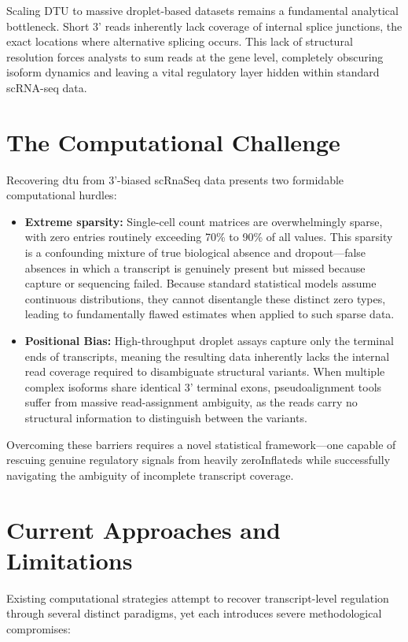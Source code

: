 Scaling DTU to massive droplet-based datasets remains a fundamental analytical bottleneck. Short 3' reads inherently lack coverage of internal splice junctions, the exact locations where alternative splicing occurs. This lack of structural resolution forces analysts to sum reads at the gene level, completely obscuring isoform dynamics and leaving a vital regulatory layer hidden within standard scRNA-seq data.

\section{The Computational Challenge}
Recovering \gls{dtu} from 3'-biased \gls{scRnaSeq} data presents two formidable computational hurdles:

\begin{itemize}
    \item \textbf{Extreme \gls{sparsity}:} Single-cell count matrices are overwhelmingly sparse, with zero entries routinely exceeding 70\% to 90\% of all values. This sparsity is a confounding mixture of true biological absence and \gls{dropout}---false absences in which a transcript is genuinely present but missed because capture or sequencing failed. Because standard statistical models assume continuous distributions, they cannot disentangle these distinct zero types, leading to fundamentally flawed estimates when applied to such sparse data.

    \item \textbf{Positional Bias:} High-throughput droplet assays capture only the terminal ends of transcripts, meaning the resulting data inherently lacks the internal read coverage required to disambiguate structural variants. When multiple complex \glspl{isoform} share identical 3' terminal exons, pseudoalignment tools suffer from massive read-assignment ambiguity, as the reads carry no structural information to distinguish between the variants.
\end{itemize}

Overcoming these barriers requires a novel statistical framework---one capable of rescuing genuine regulatory signals from heavily \glspl{zeroInflated} while successfully navigating the ambiguity of incomplete transcript coverage.

\section{Current Approaches and Limitations}
Existing computational strategies attempt to recover transcript-level regulation through several distinct paradigms, yet each introduces severe methodological compromises:


